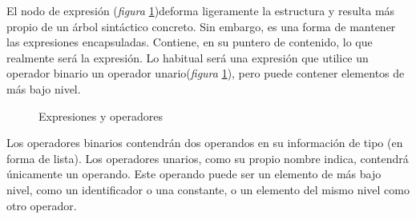 \documentclass[a4paper,10pt]{article}
\begin{document}
El nodo de expresión (\emph{figura} \ref{fig:exprop})deforma ligeramente la estructura y resulta más propio de un árbol sintáctico concreto. Sin embargo, es una forma de mantener las expresiones encapsuladas. Contiene, en su puntero de contenido, lo que realmente será la expresión. Lo habitual será una expresión que utilice un operador binario un operador unario(\emph{figura} \ref{fig:exprop}), pero puede contener elementos de más bajo nivel.
\begin{figure}[H]
  \centering
  \hspace{11mm}
  \caption{Expresiones y operadores}
  \label{fig:exprop}
\end{figure}

Los operadores binarios contendrán dos operandos en su información de tipo (en forma de lista). Los operadores unarios, como su propio nombre indica, contendrá únicamente un operando. Este operando puede ser un elemento de más bajo nivel, como un identificador o una constante, o un elemento del mismo nivel como otro operador.
\end{document}
